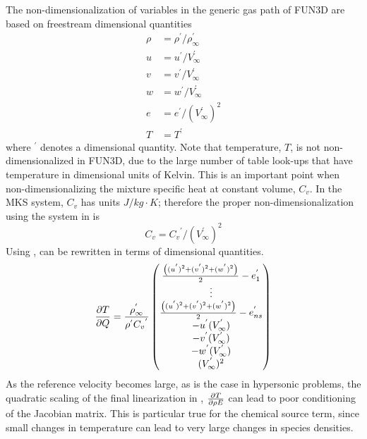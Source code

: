 The non-dimensionalization of variables in the generic gas path of FUN3D are
based on freestream dimensional quantities
\begin{equation}
  \begin{aligned}
    \rho &= \rho^{'} / \rho^{'}_{\infty} \\
    u &= u^{'} / V^{'}_{\infty} \\
    v &= v^{'} / V^{'}_{\infty} \\
    w &= w^{'} / V^{'}_{\infty} \\
    e &= e^{'} / \left( V^{'}_{\infty} \right)^2 \\
    T &= T^{'}
  \end{aligned}
  \label{nondim-gg}
\end{equation}
where $^{'}$ denotes a dimensional quantity. Note that temperature, $T$, is not
non-dimensionalized in FUN3D, due to the large number of table look-ups that have
temperature in dimensional units of Kelvin.  This is an important point when
non-dimensionalizing the mixture specific heat at constant volume, $C_v$.  In
the MKS system, $C_v$ has units $J/kg \cdot K$; therefore the proper
non-dimensionalization using the system in  is
\begin{equation}
  C_v = {C_v}^{'}/\left( V^{'}_{\infty} \right)^2
  \label{cv-nondim}
\end{equation}
Using ,  can be rewritten in
terms of dimensional quantities.
\begin{equation}
  \frac{\partial T}{\partial Q} =
  \frac{\rho^{'}_{\infty}}{\rho^{'} {C_v}^{'}}
  \begin{pmatrix}
    \frac{\left( (u^{'})^2 + (v^{'})^2 + (w^{'})^2 \right)}{2} - e^{'}_1 \\
    \vdots \\
    \frac{\left( (u^{'})^2 + (v^{'})^2 + (w^{'})^2 \right)}{2} - e^{'}_{ns} \\
    -u^{'}(V^{'}_{\infty}) \\
    -v^{'}(V^{'}_{\infty}) \\
    -w^{'}(V^{'}_{\infty}) \\
    (V^{'}_{\infty})^2
  \end{pmatrix}
  \label{tjac-dim}
\end{equation}
As the reference velocity becomes large, as is the case in hypersonic problems,
the quadratic scaling of the final linearization in ,
$\frac{\partial T}{\partial \rho E}$ can lead to poor conditioning of the Jacobian matrix.  This is
particular true for the chemical source term, since small changes in temperature
can lead to very large changes in species densities.

